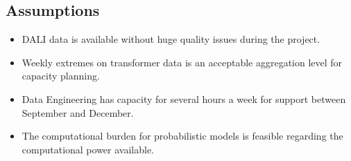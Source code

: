 \documentclass[letterpaper,10pt,english]{sphinxmanual}
\begin{document}
\subsection{Assumptions}
\label{\detokenize{business_understanding:assumptions}}\begin{itemize}
\item {} 
DALI data is available without huge quality issues during the project.

\item {} 
Weekly extremes on transformer data is an acceptable aggregation level for capacity planning.

\item {} 
Data Engineering has capacity for several hours a week for support between September and December.

\item {} 
The computational burden for probabilistic models is feasible regarding the computational power available.

\end{itemize}
\end{document}
